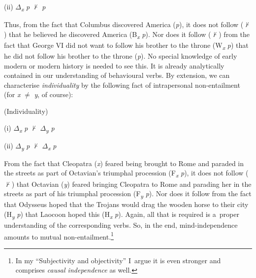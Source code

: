 (ii) $\Delta $\textit{\textsubscript{x}} \textit{p} ${\nvdash}$ \textit{p}



Thus, from the fact that Columbus discovered America (\textit{p}), it does not follow (${\nvdash}$) that he believed he discovered America (B\textit{\textsubscript{x}} \textit{p}). Nor does it follow (${\nvdash}$) from the fact that George VI did not want to follow his brother to the throne (W\textit{\textsubscript{x}} \textit{p}) that he did not follow his brother to the throne (\textit{p}). No special knowledge of early modern or modern history is needed to see this. It is already analytically contained in our understanding of behavioural verbs. By extension, we can characterise \textit{individuality} by the following fact of intrapersonal non-entailment (for \textit{x} ${\neq}$ \textit{y}, of course):



(Individuality)



(i) $\Delta $\textit{\textsubscript{x}} \textit{p} ${\nvdash}$ $\Delta $\textit{\textsubscript{y}} \textit{p}



(ii) $\Delta $\textit{\textsubscript{y}} \textit{p} ${\nvdash}$ $\Delta $\textit{\textsubscript{x}} \textit{p}



From the fact that Cleopatra (\textit{x}) feared being brought to Rome and paraded in the streets as part of Octavian's triumphal procession (F\textit{\textsubscript{x}} \textit{p}), it does not follow (${\nvdash}$) that Octavian (\textit{y}) feared bringing Cleopatra to Rome and parading her in the streets as part of his triumphal procession (F\textit{\textsubscript{y}} \textit{p}). Nor does it follow from the fact that Odysseus hoped that the Trojans would drag the wooden horse to their city (H\textit{\textsubscript{y}} \textit{p}) that Laocoon hoped this (H\textit{\textsubscript{x}} \textit{p}). Again, all that is required is a~proper understanding of the corresponding verbs. So, in the end, mind-independence amounts to mutual non-entailment.\footnote{In my ``Subjectivity and objectivity'' I~argue it is even stronger and comprises \textit{causal independence} as well.}



